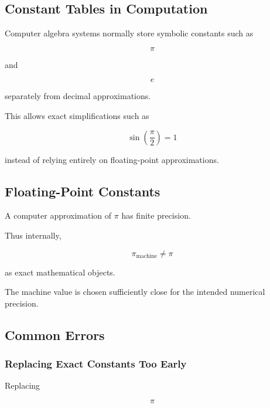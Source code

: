 \subsection{Constant Tables in Computation}
\label{subsec:constant-tables-computation}

Computer algebra systems normally store symbolic constants such as

\[
\boxed{
\pi
}
\]

and

\[
\boxed{
e
}
\]

separately from decimal approximations.

This allows exact simplifications such as

\[
\boxed{
\sin\left(\frac{\pi}{2}\right)=1
}
\]

instead of relying entirely on floating-point approximations.

\subsection{Floating-Point Constants}
\label{subsec:floating-point-constants}

A computer approximation of \(\pi\) has finite precision.

Thus internally,

\[
\boxed{
\pi_{\mathrm{machine}}
\neq
\pi
}
\]

as exact mathematical objects.

The machine value is chosen sufficiently close for the intended numerical
precision.

\subsection{Common Errors}
\label{subsec:mathematical-constants-common-errors}

\subsubsection{Replacing Exact Constants Too Early}

Replacing

\[
\pi
\]

